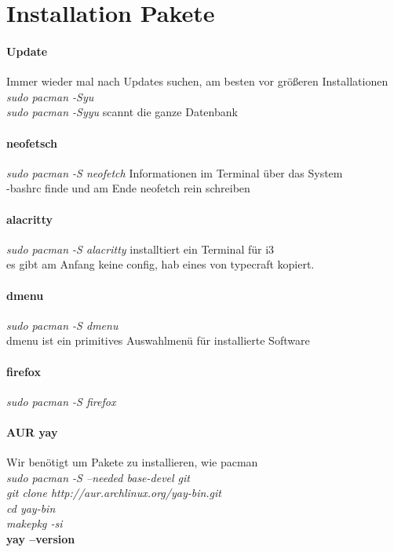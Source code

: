 \documentclass[10pt,a4paper,twoside]{book}
\begin{document}
\section{Installation Pakete}
\paragraph{Update}
Immer wieder mal nach Updates suchen, am besten vor größeren Installationen\\
\textit{sudo pacman -Syu}\\
\textit{sudo pacman -Syyu} scannt die ganze Datenbank\\
\paragraph{neofetsch}
\textit{sudo pacman -S neofetch} Informationen im Terminal über das System\\
-bashrc finde und am Ende neofetch rein schreiben\\
\paragraph{alacritty}
\textit{sudo pacman -S alacritty} installtiert ein Terminal für i3\\
es gibt am Anfang keine config, hab eines von typecraft kopiert.\\
\paragraph{dmenu}
\textit{sudo pacman -S dmenu}\\
dmenu ist ein primitives Auswahlmenü für installierte Software\\
\paragraph{firefox}
\textit{sudo pacman -S firefox}
\paragraph{AUR yay}
Wir benötigt um Pakete zu installieren, wie pacman\\
\textit{sudo pacman -S --needed base-devel git}\\
\textit{git clone http://aur.archlinux.org/yay-bin.git}\\
\textit{cd yay-bin}\\
\textit{makepkg -si}\\
\textbf{yay --version}\\
\end{document}
